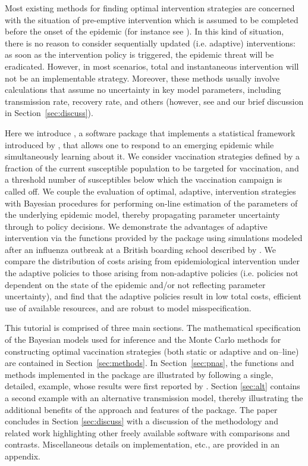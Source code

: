 \documentclass[shortnames,nojss]{jss}
\begin{document}
Most existing methods for finding optimal intervention strategies are
concerned with the situation of pre-emptive intervention which is
assumed to be completed before the onset of the epidemic (for instance
see \citet{ball02,patel05,tildesley06}).  In this kind of situation,
there is no reason to consider sequentially updated (i.e. adaptive)
interventions: as soon as the intervention policy is triggered, the
epidemic threat will be eradicated.  However, in most scenarios, total
and instantaneous intervention will not be an implementable strategy.
Moreover, these methods usually involve calculations that assume no
uncertainty in key model parameters, including transmission rate,
recovery rate, and others (however, see \citet{elderd06}
and our brief discussion in Section~\ref{sec:discuss}).

Here we introduce , a software package that implements a
statistical framework introduced by \citet{merl09}, that
allows one to respond to an emerging epidemic while simultaneously
learning about it.  We consider vaccination strategies defined by a
fraction of the current susceptible population to be targeted for
vaccination, and a threshold number of susceptibles below which the
vaccination campaign is called off. We couple the evaluation of
optimal, adaptive, intervention strategies with Bayesian procedures
for performing on-line estimation of the parameters of the underlying
epidemic model, thereby propagating parameter uncertainty through to
policy decisions. We demonstrate the advantages of adaptive
intervention via the functions provided by the package using
simulations modeled after an influenza outbreak at a British boarding
school described by \citet{murray02}. We compare the
distribution of costs arising from epidemiological intervention under
the adaptive policies to those arising from non-adaptive policies
(i.e. policies not dependent on the state of the epidemic and/or not
reflecting parameter uncertainty), and find that the adaptive policies
result in low total costs, efficient use of available resources,
and are robust to model misspecification.

This tutorial is comprised of three main sections.  The mathematical
specification of the Bayesian models used for inference and the Monte
Carlo methods for constructing optimal vaccination strategies (both
static or adaptive and on--line) are contained in
Section~\ref{sec:methods}.  In Section~\ref{sec:pnas}, the functions
and methods implemented in the package are illustrated by following a
single, detailed, example, whose results were first reported by
\citet{merl09}.  Section \ref{sec:alt} contains a second example with
an alternative transmission model, thereby illustrating the additional
benefits of the approach and features of the package.  The paper
concludes in Section \ref{sec:discuss} with a discussion of the
methodology and related work highlighting other freely available
software with comparisons and contrasts.  Miscellaneous details on
implementation, etc., are provided in an appendix.
\end{document}
